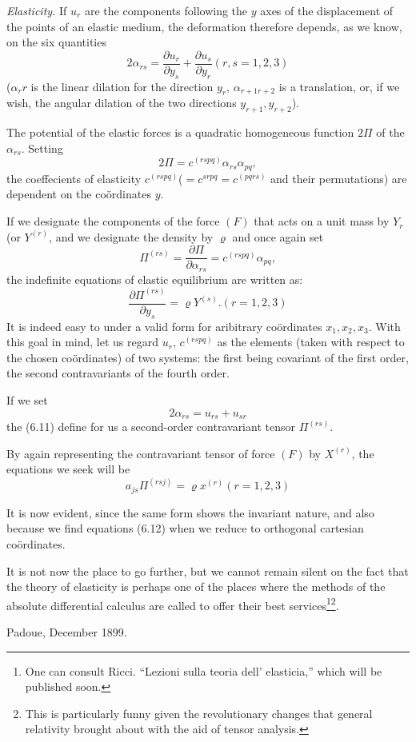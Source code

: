 \documentclass{book}
\begin{document}
\emph{Elasticity.} If $u_r$ are the components following the $y$ axes of the displacement of the points of an elastic medium, the deformation therefore depends, as we know, on the six quantities
\begin{equation}
2\alpha_{rs}=\frac{\partial u_r}{\partial y_s}+\frac{\partial u_s}{\partial y_r} (r,s=1,2,3)
\end{equation}
($\alpha_rr$ is the linear dilation for the direction $y_r$, $\alpha_{r+1r+2}$ is a translation, or, if we wish, the angular dilation of the two directions $y_{r+1},y_{r+2}$).	

The potential of the elastic forces is a quadratic homogeneous function $2\Pi$ of the $\alpha_{rs}$. Setting
$$2\Pi=c^{(rspq)}\alpha_{rs}\alpha_{pq},$$
the coeffecients of elasticity $c^{(rspq)}$($=c^{srpq}=c^{(pqrs)}$ and their permutations) are dependent on the co\"ordinates $y$.

If we designate the components of the force $(F)$ that acts on a unit mass by $Y_r$ (or $Y^{(r)}$, and we designate the density by $\varrho$ and once again set
\begin{equation}
\Pi^{(rs)}=\frac{\partial\Pi}{\partial\alpha_{rs}}=c^{(rspq)}\alpha_{pq},
\end{equation}
the indefinite equations of elastic equilibrium are written as:
\begin{equation}
\frac{\partial\Pi^{(rs)}}{\partial y_s}=\varrho Y^{(s)}. (r=1,2,3)
\end{equation}
It is indeed easy to under a valid form for aribitrary co\"ordinates $x_1,x_2,x_3$. With this goal in mind, let us regard $u_r$, $c^{(rspq)}$ as the elements (taken with respect to the chosen co\"ordinates) of two systems: the first being covariant of the first order, the second contravariants of the fourth order.

If we set
\begin{equation*}
2\alpha_{rs}=u_{rs}+u_{sr}
\tag{6.10'}
\end{equation*}
the (6.11) define for us a second-order contravariant tensor $\Pi^{(rs)}$.

By again representing the contravariant tensor of force $(F)$ by $X^{(r)}$, the equations we seek will be
\begin{equation*}
a_{js}\Pi^{(rsj)}=\varrho x^{(r)}(r=1,2,3)
\tag{6.11'}
\end{equation*}

It is now evident, since the same form shows the invariant nature, and also because we find equations (6.12) when we reduce to orthogonal cartesian co\"ordinates.

It is not now the place to go further, but we cannot remain silent on the fact that the theory of elasticity is perhaps one of the places where the methods of the absolute differential calculus are called to offer their best services\footnote{One can consult Ricci. ``Lezioni sulla teoria dell' elasticia,'' which will be published soon.}\footnote{This is particularly funny given the revolutionary changes that general relativity brought about with the aid of tensor analysis.}.

Padoue, December 1899.  

\end{document}
